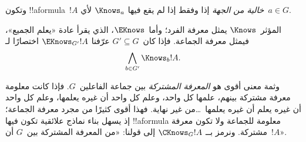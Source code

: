 \documentclass[../../../include/open-logic-section]{subfiles}
\begin{document}
وتكون !!a{formula}~$!A$ \emph{خالية من الجهة} إذا وفقط إذا لم يقع فيها
$\Knows_a$ لأي~$a \in G$.

\begin{defn}
  المؤثر~$\Knows$ يمثل معرفة الفرد؛ وأما~$\EKnows$، الذي يقرأ عادة
  «يعلم الجميع»، فيمثل معرفة الجماعة. فإذا كان~$G' \subseteq G$ عرّفنا
  $\EKnows_{G'} !A$ اختصارًا لـ
  \[\bigwedge_{b \in G'} \Knows_b !A.\]
\end{defn}

وثمة معنى أقوى هو \emph{المعرفة المشتركة} بين جماعة الفاعلين~$G$. فإذا
كانت معلومة معرفة مشتركة بينهم، علمها كل واحد، وعلم كل واحد أن غيره
يعلمها، وعلم كل واحد أن غيره يعلم أن غيره يعلمها~\dots من غير نهاية.
فهذا أقوى كثيرًا من مجرد معرفة الجماعة؛ إذ يسهل بناء نماذج علائقية تكون
فيها !!a{formula} معلومة للجماعة ولا تكون معرفة مشتركة. ونرمز بــ
$\CKnows_G !A$ إلى قولنا: «من المعرفة المشتركة بين~$G$ أن~$!A$».
\end{document}
